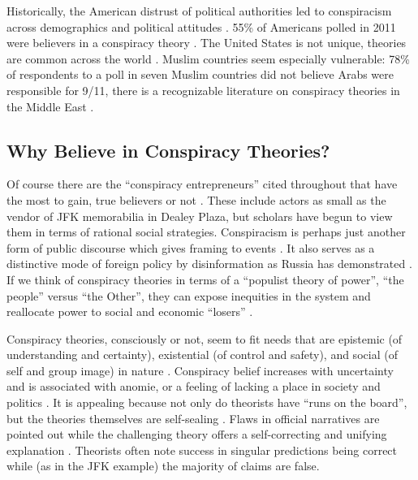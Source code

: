 Historically, the American distrust of political authorities led to conspiracism across demographics and political attitudes \cite[p. 952]{oliver2014} \cite{goertzel1994}.
55\% of Americans polled in 2011 were believers in a conspiracy theory \cite[p. 956]{oliver2014}.
The United States is not unique, theories are common across the world \cite[p. 824]{miller2016} \cite{byford2001} \cite{zonis1994}.
Muslim countries seem especially vulnerable: 78\% of respondents to a poll in seven Muslim countries did not believe Arabs were responsible for 9/11, there is a recognizable literature on conspiracy theories in the Middle East \cite{gentzkow2004} \cite{zonis1994} \cite{pipes1996}.

\subsection{Why Believe in Conspiracy Theories?}

Of course there are the ``conspiracy entrepreneurs'' cited throughout that have the most to gain, true believers or not \cite[p. 213]{sunstein2009}.
These include actors as small as the vendor of JFK memorabilia in Dealey Plaza, but scholars have begun to view them in terms of rational social strategies.
Conspiracism is perhaps just another form of public discourse which gives framing to events \cite{erikson2015}.
It also serves as a distinctive mode of foreign policy by disinformation as Russia has demonstrated \cite{sakwa2012} \cite{watanabe2018}.
If we think of conspiracy theories in terms of a ``populist theory of power'', ``the people'' versus ``the Other'', they can expose inequities in the system and reallocate power to social and economic ``losers'' \cite{fenster2008} \cite{smallpage2017}.

Conspiracy theories, consciously or not, seem to fit needs that are epistemic (of understanding and certainty), existential (of control and safety), and social (of self and group image) in nature \cite[p. 7]{douglas2019} \cite{swami2010}.
Conspiracy belief increases with uncertainty and is associated with anomie, or a feeling of lacking a place in society and politics \cite[p. 8]{douglas2019} \cite[p. 739]{goertzel1994}.
It is appealing because not only do theorists have ``runs on the board'', but the theories themselves are self-sealing \cite[p. 132]{clarke2002} \cite[p. 7]{douglas2019}.
Flaws in official narratives are pointed out while the challenging theory offers a self-correcting and unifying explanation \cite[pp. 119, 135]{keeley1999}.
Theorists often note success in singular predictions being correct while (as in the JFK example) the majority of claims are false.

